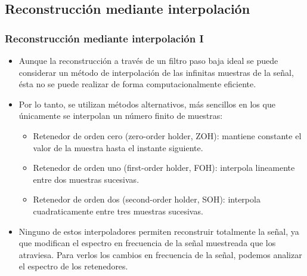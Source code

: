 \subsection{Reconstrucción mediante interpolación}

\begin{frame}
\frametitle{Reconstrucción mediante interpolación I}

\footnotesize 
\begin{itemize}
\item Aunque la reconstrucción a través de un filtro paso baja ideal se puede considerar un método de interpolación de las infinitas muestras de la señal, ésta no se puede realizar de forma computacionalmente eficiente.
\item Por lo tanto, se utilizan métodos alternativos, más sencillos en los que únicamente se interpolan un número finito de muestras:
\begin{itemize}
\footnotesize 
\item Retenedor de orden cero (zero-order holder, ZOH): mantiene constante el valor de la muestra hasta el instante siguiente.
\item Retenedor de orden uno (first-order holder, FOH): interpola lineamente entre dos muestras sucesivas.
\item Retenedor de orden dos (second-order holder, SOH): interpola cuadraticamente entre tres muestras sucesivas.

\end{itemize}

\item Ninguno de estos interpoladores permiten reconstruir totalmente la señal, ya que modifican el espectro en frecuencia de la señal muestreada que los atraviesa. Para verlos los cambios en frecuencia de la señal, podemos analizar el espectro de los retenedores.

\end{itemize}
\end{frame}

